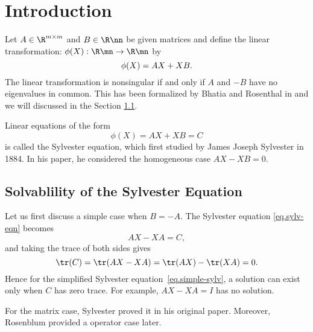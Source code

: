 \documentclass{article}
\begin{document}
\maketitle
\tableofcontents
\thispagestyle{firstpage}

\section{Introduction}
\label{sec.introduction}

Let $A\in\R^{m\times m}$ and $B\in\R\nn$ be given matrices and
define the linear transformation: $\phi(X) :\R\mn \to \R\mn$ by 
\begin{equation}\notag
  \phi(X) = AX + XB.
\end{equation}
The linear transformation is nonsingular if and only if $A$ and $-B$ have
no eigenvalues in common.
This has been formalized by Bhatia and Rosenthal in \cite{bhro97}
and we will discussed in the Section \ref{sec.solv-sylv-equat}.

Linear equations of the form
\begin{equation}\label{eq.sylv-eqn}
  \phi(X) = AX + XB = C
\end{equation}
is called the Sylvester equation,
which first studied by James Joseph Sylvester in 1884.
In his paper, he considered the homogeneous case $AX - XB = 0$.

\subsection{Solvablility of the Sylvester Equation}
\label{sec.solv-sylv-equat}
Let us first discuss a simple case when $B = -A$.
The Sylvester equation \eqref{eq.sylv-eqn} becomes
\begin{equation}\label{eq.simple-sylv}
  AX - XA = C,
\end{equation}
and taking the trace of both sides gives
\begin{equation}\notag
  \tr(C) = \tr(AX - XA) = \tr(AX) - \tr(XA) = 0. 
\end{equation}
Hence for the simplified Sylvester equation~\eqref{eq.simple-sylv},
a solution can exist only when $C$ has zero trace.
For example, $AX - XA = I$ has no solution. 

For the matrix case, Sylvester proved it in his original paper.
Moreover, Rosenblum \cite{rose69} provided a operator case later.
\end{document}
